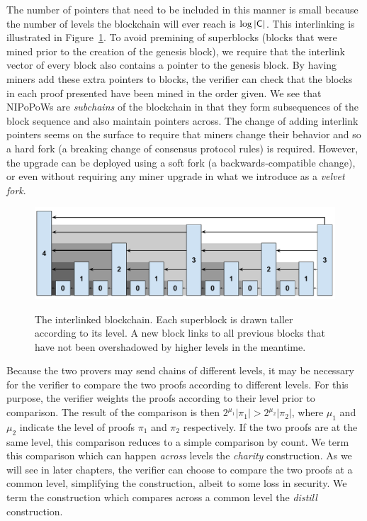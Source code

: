 The number of pointers that need to be included in this manner is small because
the number of levels the blockchain will ever reach is $\log|\mathsf{C}|$. This
interlinking is illustrated in Figure~\ref{fig.hierarchy}. To avoid premining of
superblocks (blocks that were mined prior to the creation of the genesis block),
we require that the interlink vector of every block also contains a pointer to
the genesis block. By having miners add these extra pointers to blocks, the
verifier can check that the blocks in each proof presented have been mined in
the order given. We see that NIPoPoWs are \emph{subchains} of the blockchain in
that they form subsequences of the block sequence and also maintain pointers
across. The change of adding interlink pointers seems on the surface to require
that miners change their behavior and so a hard fork (a breaking change of
consensus protocol rules) is required. However, the upgrade can be deployed
using a soft fork (a backwards-compatible change), or even without requiring any
miner upgrade in what we introduce as a \emph{velvet fork}.

\begin{figure}[ht]
    \caption{The interlinked blockchain. Each superblock is drawn taller
    according to its level. A new block links to all previous blocks that
    have not been overshadowed by higher levels in the meantime.}
    \centering
    \includegraphics[width=0.9\columnwidth,keepaspectratio]{chapters/introduction/figures/level-shadows.pdf}
    \label{fig.hierarchy}
\end{figure}

Because the two provers may send chains of different levels, it may be necessary
for the verifier to compare the two proofs according to different levels. For
this purpose, the verifier weights the proofs according to their level prior to
comparison. The result of the comparison is then
$2^{\mu_1}|\pi_1| > 2^{\mu_2}|\pi_2|$, where $\mu_1$ and $\mu_2$ indicate the
level of proofs $\pi_1$ and $\pi_2$ respectively. If the two proofs are at the
same level, this comparison reduces to a simple comparison by count. We term
this comparison which can happen \emph{across} levels the \emph{charity}
construction. As we will see in later chapters, the verifier can choose to
compare the two proofs at a common level, simplifying the construction, albeit
to some loss in security. We term the construction which compares across a
common level the \emph{distill} construction.

